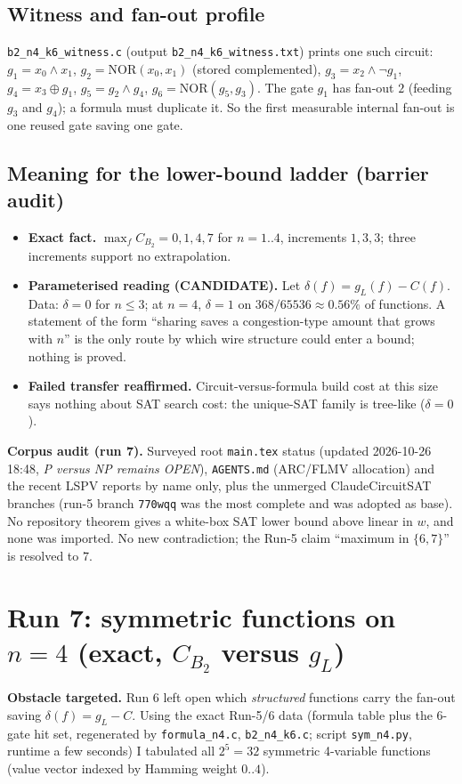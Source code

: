 \documentclass[11pt]{article}
\begin{document}
\subsection{Witness and fan-out profile}
\texttt{b2\_n4\_k6\_witness.c} (output \texttt{b2\_n4\_k6\_witness.txt}) prints one such circuit: $g_1=x_0\wedge x_1$, $g_2=\mathrm{NOR}(x_0,x_1)$ (stored complemented), $g_3=x_2\wedge\neg g_1$, $g_4=x_3\oplus g_1$, $g_5=g_2\wedge g_4$, $g_6=\mathrm{NOR}(g_5,g_3)$. The gate $g_1$ has fan-out $2$ (feeding $g_3$ and $g_4$); a formula must duplicate it. So the first measurable internal fan-out is one reused gate saving one gate.

\subsection{Meaning for the lower-bound ladder (barrier audit)}
\begin{itemize}
\item \textbf{Exact fact.} $\max_f C_{B_2}=0,1,4,7$ for $n=1..4$, increments $1,3,3$; three increments support no extrapolation.
\item \textbf{Parameterised reading (CANDIDATE).} Let $\delta(f)=g_L(f)-C(f)$. Data: $\delta=0$ for $n\le3$; at $n=4$, $\delta=1$ on $368/65536\approx0.56\%$ of functions. A statement of the form ``sharing saves a congestion-type amount that grows with $n$'' is the only route by which wire structure could enter a bound; nothing is proved.
\item \textbf{Failed transfer reaffirmed.} Circuit-versus-formula build cost at this size says nothing about SAT search cost: the unique-SAT family is tree-like ($\delta=0$).
\end{itemize}

\textbf{Corpus audit (run 7).} Surveyed root \texttt{main.tex} status (updated 2026-10-26 18:48, \emph{P versus NP remains OPEN}), \texttt{AGENTS.md} (ARC/FLMV allocation) and the recent LSPV reports by name only, plus the unmerged ClaudeCircuitSAT branches (run-5 branch \texttt{770wqq} was the most complete and was adopted as base). No repository theorem gives a white-box SAT lower bound above linear in $w$, and none was imported. No new contradiction; the Run-5 claim ``maximum in $\{6,7\}$'' is resolved to $7$.

\section{Run 7: symmetric functions on $n=4$ (exact, $C_{B_2}$ versus $g_L$)}\label{sec:r7}
\textbf{Obstacle targeted.} Run 6 left open which \emph{structured} functions carry the fan-out saving $\delta(f)=g_L-C$. Using the exact Run-5/6 data (formula table plus the 6-gate hit set, regenerated by \texttt{formula\_n4.c}, \texttt{b2\_n4\_k6.c}; script \texttt{sym\_n4.py}, runtime a few seconds) I tabulated all $2^5=32$ symmetric 4-variable functions (value vector indexed by Hamming weight $0..4$).
\end{document}
